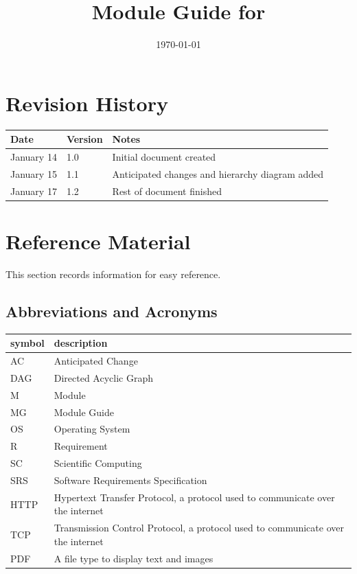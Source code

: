 \documentclass[12pt, titlepage]{article}
\begin{document}
	
	\title{Module Guide for \progname{}} 
	\author{\authname}
	\date{\today}
	
	\maketitle
	
	
	\section{Revision History}
	
	\begin{tabularx}{\textwidth}{p{3cm}p{2cm}X}
		\toprule {\bf Date} & {\bf Version} & {\bf Notes}\\
		\midrule
		January 14 & 1.0 & Initial document created\\
		January 15 & 1.1 & Anticipated changes and hierarchy diagram added\\
		January 17 & 1.2 & Rest of document finished\\
		\bottomrule
	\end{tabularx}
	
	\newpage
	
	\section{Reference Material}
	
	This section records information for easy reference.
	
	\subsection{Abbreviations and Acronyms}
	
	\renewcommand{\arraystretch}{1.2}
	\begin{tabular}{l l} 
		\toprule		
		\textbf{symbol} & \textbf{description}\\
		\midrule 
		AC & Anticipated Change\\
		DAG & Directed Acyclic Graph \\
		M & Module \\
		MG & Module Guide \\
		OS & Operating System \\
		R & Requirement\\
		SC & Scientific Computing \\
		SRS & Software Requirements Specification\\
		HTTP & Hypertext Transfer Protocol, a protocol used to communicate over the internet\\
		TCP & Transmission Control Protocol, a protocol used to communicate over the internet\\
		PDF & A file type to display text and images\\
		\bottomrule
	\end{tabular}\\
	
\end{document}
